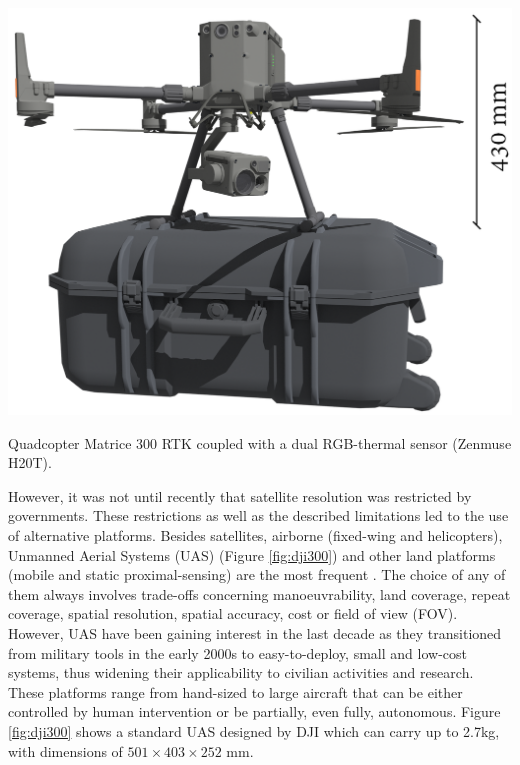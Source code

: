 \begin{marginfigure}[.7cm]
	\includegraphics{figs/introduction/dji300.png}
	\caption{Quadcopter Matrice 300 RTK coupled with a dual RGB-thermal sensor (Zenmuse H20T). }
	\label{fig:dji300}
\end{marginfigure}
However, it was not until recently that satellite resolution was restricted by governments. These restrictions as well as the described limitations led to the use of alternative platforms. Besides satellites, airborne (fixed-wing and helicopters), Unmanned Aerial Systems (UAS) (Figure \ref{fig:dji300}) and other land platforms (mobile and static proximal-sensing) are the most frequent \cite{lillesand_remote_2015}. The choice of any of them always involves trade-offs concerning manoeuvrability, land coverage, repeat coverage, spatial resolution, spatial accuracy, cost or field of view (FOV). However, UAS have been gaining interest in the last decade as they transitioned from military tools in the early 2000s to easy-to-deploy, small and low-cost systems, thus widening their applicability to civilian activities and research. These platforms range from hand-sized to large aircraft that can be either controlled by human intervention or be partially, even fully, autonomous. Figure \ref{fig:dji300} shows a standard UAS designed by DJI which can carry up to 2.7\si{\kilo\gram}, with dimensions of $501 \times 403 \times 252$ \si{\milli\meter}.

